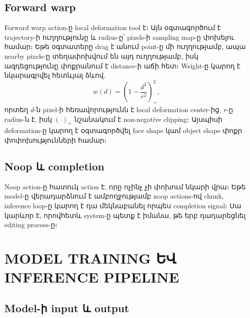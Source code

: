 \documentclass[12pt,a4paper]{report}
\begin{document}
\section{Forward warp}

Forward warp action-ը local deformation tool է։ Այն օգտագործում է trajectory-ի ուղղությունը և radius-ը՝ pixels-ի sampling map-ը փոխելու համար։ Եթե օգտատերը drag է անում point-ը մի ուղղությամբ, ապա nearby pixels-ը տեղափոխվում են այդ ուղղությամբ, իսկ ազդեցությունը փոքրանում է distance-ի աճի հետ։ Weight-ը կարող է նկարագրվել հետևյալ ձևով.
\begin{equation}
    w(d)=\left(1-\frac{d^2}{r^2}\right)^2_+,
\end{equation}
որտեղ $d$-ն pixel-ի հեռավորությունն է local deformation center-ից, $r$-ը radius-ն է, իսկ $(\cdot)_+$ նշանակում է non-negative clipping։ Այսպիսի deformation-ը կարող է օգտագործվել face shape կամ object shape փոքր փոփոխությունների համար։

\section{Noop և completion}

Noop action-ը հատուկ action է, որը ոչինչ չի փոխում նկարի վրա։ Եթե model-ը վերադարձնում է ամբողջությամբ noop actions-ով chunk, inference loop-ը կարող է դա մեկնաբանել որպես completion signal։ Սա կարևոր է, որովհետև system-ը պետք է իմանա, թե երբ դադարեցնել editing process-ը։

\chapter{MODEL TRAINING ԵՎ INFERENCE PIPELINE}

\section{Model-ի input և output}
\end{document}
